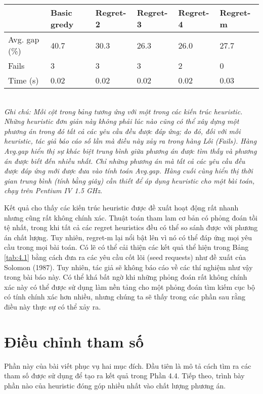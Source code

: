 \begin{table}[caption={Hiệu suất của Kiến trúc Heuristics}, label=tab:4.1]
    \begin{tabular}{@{}llllll@{}}
        \toprule
                      & Basic gredy & Regret-2 & Regret-3 & Regret-4 & Regret-m \\ \midrule
        Avg. gap (\%) & 40.7        & 30.3     & 26.3     & 26.0     & 27.7     \\
        Fails         & 3           & 3        & 3        & 2        & 0        \\
        Time (s)      & 0.02        & 0.02     & 0.02     & 0.02     & 0.03     \\ \bottomrule
    \end{tabular} \\
    \justify
    \textit{Ghi chú: Mỗi cột trong bảng tương ứng với một trong các kiến trúc heuristic. Những heuristic đơn giản này không phải lúc nào cũng có thể xây dựng một phương án trong đó tất cả các yêu cầu đều được đáp ứng; do đó, đối với mỗi heuristic, tác giả báo cáo số lần mà điều này xảy ra trong hàng Lỗi (Fails). Hàng Avg.gap hiển thị sự khác biệt trung bình giữa phương án được tìm thấy và phương án được biết đến nhiều nhất. Chỉ những phương án mà tất cả các yêu cầu đều được đáp ứng mới được đưa vào tính toán Avg.gap. Hàng cuối cùng hiển thị thời gian trung bình (tính bằng giây) cần thiết để áp dụng heuristic cho một bài toán, chạy trên Pentium IV 1.5 GHz.}
\end{table}



Kết quả cho thấy các kiến trúc heuristic được đề xuất hoạt động rất nhanh nhưng cũng rất không chính xác. Thuật toán tham lam cơ bản có phỏng đoán tồi tệ nhất, trong khi tất cả các regret heuristics đều có thể so sánh được với phương án chất lượng. Tuy nhiên, regret-m lại nổi bật lên vì nó có thể đáp ứng mọi yêu cầu trong mọi bài toán. Có lẽ có thể cải thiện các kết quả thể hiện trong Bảng \ref{tab:4.1} bằng cách đưa ra các yêu cầu cốt lõi (seed requests) như đề xuất của Solomon (1987). Tuy nhiên, tác giả sẽ không báo cáo về các thí nghiệm như vậy trong bài báo này. Có thể khá bất ngờ khi những phỏng đoán rất không chính xác này có thể được sử dụng làm nền tảng cho một phỏng đoán tìm kiếm cục bộ có tính chính xác hơn nhiều, nhưng chúng ta sẽ thấy trong các phần sau rằng điều này thực sự có thể xảy ra.


\section{Điều chỉnh tham số}
Phần này của bài viết phục vụ hai mục đích. Đầu tiên là mô tả cách tìm ra các tham số được sử dụng để tạo ra kết quả trong Phần 4.4. Tiếp theo, trình bày phần nào của heuristic đóng góp nhiều nhất vào chất lượng phương án.


